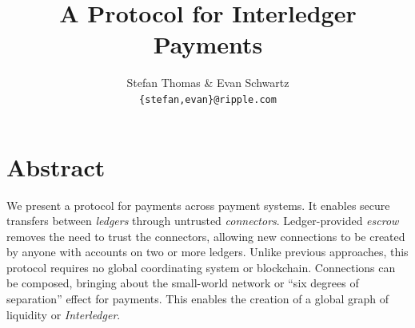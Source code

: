 \documentclass[letterpaper,twocolumn,10pt]{article}
\begin{document}
\date{}

\title{\Large \bf A Protocol for Interledger Payments}

\author{
\textnormal{Stefan Thomas \& Evan Schwartz} \\
\textnormal{\texttt{\{stefan,evan\}@ripple.com}}
}

\maketitle

\thispagestyle{empty}
\section*{Abstract}

We present a protocol for payments across payment systems. It enables secure transfers between \textit{ledgers} through untrusted \textit{connectors}. Ledger-provided \textit{escrow} removes the need to trust the connectors, allowing new connections to be created by anyone with accounts on two or more ledgers. Unlike previous approaches, this protocol requires no global coordinating system or blockchain. Connections can be composed, bringing about the small-world network or ``six degrees of separation'' effect for payments. This enables the creation of a global graph of liquidity or \mbox{\textit{Interledger}}.


\end{document}
